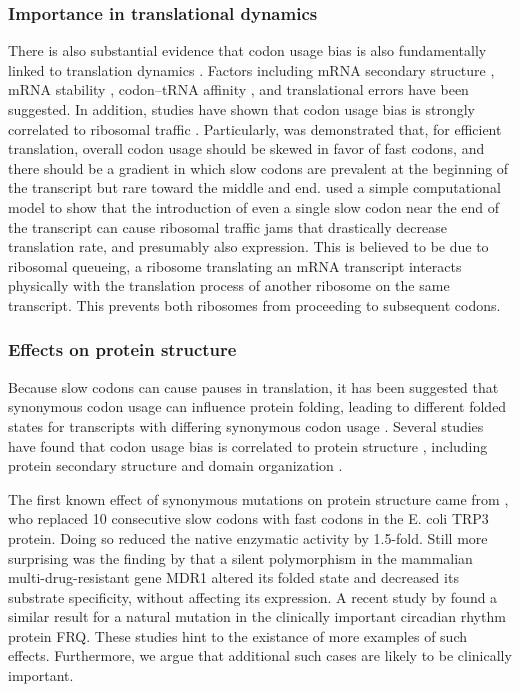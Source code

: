 \documentclass[11pt]{nih}
\begin{document}
\subsubsection{Importance in translational dynamics}
There is also substantial evidence that codon usage bias is also fundamentally linked to translation dynamics  \citep{Bentele2013,Mitarai2013,Cannarozzi2010,Fredrick2010,Marin2008,Buchan2007}. Factors including mRNA secondary structure \citep{Stoletzki2008,Chamary2005,Baim1985}, mRNA stability \citep{Gu2010}, codon--tRNA affinity \cite{Klumpp2012}, and translational errors \cite{Zhou2009,Drummond2008,Najafabadi2007} have been suggested. In addition, studies have shown that codon usage bias is strongly correlated to ribosomal traffic \citep{Cannarozzi2010a,Buchan2007,Komar1999}.  Particularly, was demonstrated that, for efficient translation, overall codon usage should be skewed in favor of fast codons, and there should be a gradient in which slow codons are prevalent at the beginning of the transcript but rare toward the middle and end. \citet{Mitarai2013} used a simple computational model to show that the introduction of even a single slow codon near the end of the transcript can cause ribosomal traffic jams that drastically decrease translation rate, and presumably also expression. This is believed to be due to ribosomal queueing, a ribosome translating an mRNA transcript interacts physically with the translation process of another ribosome on the same transcript. This prevents both ribosomes from proceeding to subsequent codons.

\subsubsection{Effects on protein structure}
Because slow codons can cause pauses in translation, it has been suggested that synonymous codon usage can influence protein folding, leading to different folded states for transcripts with differing synonymous codon usage \cite{Komar2009,Zhang2009,Buchan2007,Crombie1994}.
Several studies have found that codon usage bias is correlated to protein structure \citep{Saunders2010,Biro2006,Adzhubei1996,Gu2003}, including protein secondary structure \citep{Saunders2010,Oresic2003,Gu2003,Thanaraj1996a} and domain organization \citep{Gu2004,Oresic2003}.

The first known effect of synonymous mutations on protein structure came from \citet{Crombie1994}, who replaced 10 consecutive slow codons with fast codons in the E. coli TRP3 protein. Doing so reduced the native enzymatic activity by 1.5-fold. Still more surprising was the finding by \citet{Sarfaty2007} that a silent polymorphism in the mammalian multi-drug-resistant gene MDR1 altered its folded state and decreased its substrate specificity, without affecting its expression. A recent study by \citet{Zhou2013} found a similar result for a natural mutation in the clinically important circadian rhythm protein FRQ. These studies hint to the existance of more examples of such effects. Furthermore, we argue that additional such cases are likely to be clinically important. 
\end{document}
